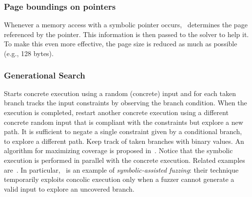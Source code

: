 \subsubsection{Page boundings on pointers} Whenever a memory access with a symbolic pointer occurs,~\cite{CKC-TOCS12} determines the page referenced by the pointer. This information is then passed to the solver to help it. To make this even more effective, the page size is reduced as much as possible (e.g., 128 bytes).


\subsubsection{Generational Search}
Starts concrete execution using a random (concrete) input and for each taken branch tracks the input constraints by observing the branch condition. When the execution is completed, restart another concrete execution using a different concrete random input that is compliant with the constraints but explore a new path. It is sufficient to negate a single constraint given by a conditional branch, to explore a different path. Keep track of taken branches with binary values. An algorithm for maximizing coverage is proposed in~\cite{DART-PLDI05}. Notice that the symbolic execution is performed in parallel with the concrete execution. Related examples are~\cite{SAGE-NDSS08,DRILLER-NDSS16}. In particular,~\cite{DRILLER-NDSS16} is an example of {\em symbolic-assisted fuzzing}: their technique temporarily exploits concolic execution only when a fuzzer cannot generate a valid input to explore an uncovered branch.

